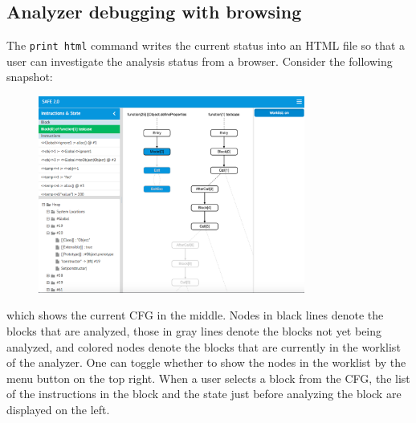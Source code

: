 \subsection{Analyzer debugging with browsing}
\label{s:3:2:2:refman}
The \verb!print html! command writes the current status into an HTML file
so that a user can investigate the analysis status from a browser.
Consider the following snapshot:
\begin{figure}[H]
\includegraphics[width=8.75cm]{htmldebugger.png}
\end{figure}
\noindent
which shows the current CFG in the middle.
Nodes in black lines denote the blocks that are analyzed,
those in gray lines denote the blocks not yet being analyzed, and
colored nodes denote the blocks that are currently in the worklist of the analyzer.
One can toggle whether to show the nodes in the worklist by the menu button on the top right.
When a user selects a block from the CFG, the list of the instructions in the block
and the state just before analyzing the block are displayed on the left.
